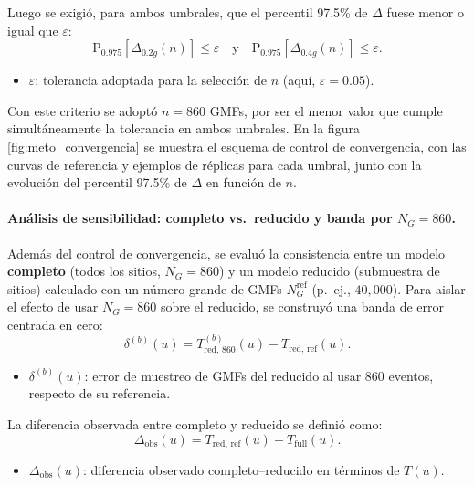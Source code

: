 Luego se exigió, para ambos umbrales, que el percentil 97.5\% de $\Delta$ fuese menor o igual que $\varepsilon$:
\begin{equation}
\mathrm{P}_{0.975}\!\left[\Delta_{0.2g}(n)\right]\le \varepsilon
\quad \text{y}\quad
\mathrm{P}_{0.975}\!\left[\Delta_{0.4g}(n)\right]\le \varepsilon.
\label{eq:criterion_eps}
\end{equation}
\begin{itemize}
  \item $\varepsilon$: tolerancia adoptada para la selección de $n$ (aquí, $\varepsilon=0.05$).
\end{itemize}

Con este criterio se adoptó $n=860$ GMFs, por ser el menor valor que cumple simultáneamente la tolerancia en ambos umbrales. En la figura \ref{fig:meto_convergencia} se muestra el esquema de control de convergencia, con las curvas de referencia y ejemplos de réplicas para cada umbral, junto con la evolución del percentil 97.5\% de $\Delta$ en función de $n$.

\paragraph{Análisis de sensibilidad: completo vs.\ reducido y banda por $N_G=860$.}
Además del control de convergencia, se evaluó la consistencia entre un modelo \textbf{completo} (todos los sitios, $N_G=860$) y un modelo reducido (submuestra de sitios) calculado con un número grande de GMFs $N_G^{\mathrm{ref}}$ (p.\ ej., $40{,}000$). Para aislar el efecto de usar $N_G=860$ sobre el reducido, se construyó una banda de error centrada en cero:
\begin{equation}
\delta^{(b)}(u)=T^{(b)}_{\mathrm{red},\,860}(u)-T_{\mathrm{red},\,\mathrm{ref}}(u).
\label{eq:delta_boot_u}
\end{equation}
\begin{itemize}
  \item $\delta^{(b)}(u)$: error de muestreo de GMFs del reducido al usar $860$ eventos, respecto de su referencia.
\end{itemize}

La diferencia observada entre completo y reducido se definió como:
\begin{equation}
\Delta_{\mathrm{obs}}(u)=T_{\mathrm{red},\,\mathrm{ref}}(u)-T_{\mathrm{full}}(u).
\label{eq:Delta_obs_u}
\end{equation}
\begin{itemize}
  \item $\Delta_{\mathrm{obs}}(u)$: diferencia observado completo--reducido en términos de $T(u)$.
\end{itemize}

